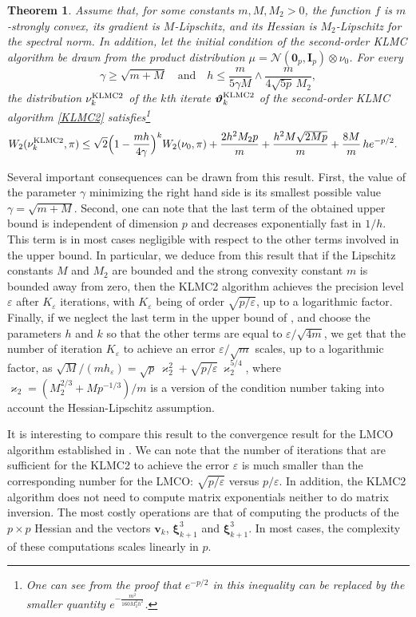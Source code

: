 \documentclass[a4paper,bej,preprint,reqno]{imsart}
\newcommand\bv{\boldsymbol v}
\newcommand\bxi{\boldsymbol \xi}
\newcommand\bfI{\mathbf I}
\newcommand\bvartheta{\boldsymbol\vartheta}
\newtheorem{theorem}{Theorem}
\begin{document}
\begin{theorem}\label{th:4}
Assume that, for some constants $m,M,M_2>0$, the function $f$ is
$m$-strongly convex, its gradient is $M$-Lipschitz, and its Hessian is $M_2$-Lipschitz for the spectral norm.
In addition, let the initial condition of the second-order KLMC algorithm be drawn
from the product distribution $\mu = \mathcal N(\mathbf 0_p,\bfI_p)\otimes \nu_0$.
For every 
$$
\gamma\ge \sqrt{m+M}\quad \text{and}\quad h\le \frac{m}{5\gamma M}\wedge
\frac{m}{4\sqrt{5p}\,M_2}, 
$$
the distribution
$\nu_k^{\rm KLMC2}$  of the $k$th iterate $\bvartheta_k^{\rm KLMC2}$ of the
second-order KLMC algorithm \eqref{KLMC2} satisfies\footnote{One can see
from the proof that $e^{-p/2}$ in this inequality can be replaced
by the smaller quantity $e^{-\frac{m^2}{160 M_2^2h^2}}$.
}
\begin{align}
		W_2(\nu_k^{\rm KLMC2},\pi)
		&\le \sqrt{2}\Big(1-\frac{mh}{4\gamma}\Big)^{k}W_2(\nu_0,\pi)		
		+\frac{2h^2{M_2p}}{m}+\frac{h^2 M\sqrt{2Mp}}{{m}}
		+ \frac{8M}{m}\, h e^{-p/2} .\label{s5:1}
\end{align}
\end{theorem}

Several important consequences can be drawn from this result. First, 
the value of the parameter $\gamma$ minimizing the right hand side is its smallest
possible value $\gamma = \sqrt{m+M}$. Second, one can note that the last term of 
the obtained upper bound is independent of dimension $p$ and decreases exponentially
fast in $1/h$. This term is in most cases negligible with respect to the other terms
involved in the upper bound. In particular, we deduce from this result that if 
the Lipschitz constants $M$ and $M_2$ are bounded and the strong convexity constant 
$m$ is bounded  away from zero, then the KLMC2 algorithm achieves the precision level 
$\varepsilon$ after $K_\varepsilon$ iterations, with $K_\varepsilon$ being of order 
$\sqrt{p/\varepsilon}$, up to a logarithmic factor. Finally, if we neglect the last 
term in the upper bound of , and choose the parameters $h$ and $k$ 
so that the other terms are equal to $\varepsilon/\sqrt{4m}$, we get that
the number of iteration $K_{\varepsilon}$ to achieve an error $\varepsilon/\sqrt{m}$ 
scales, up to a logarithmic factor, as  $\sqrt{M}/(mh_\varepsilon) = 
\sqrt{p}\,\varkappa_2^2 + \sqrt{p/\varepsilon}\,\varkappa_2^{5/4}$, where 
$\varkappa_2 = (M_2^{2/3} + Mp^{-1/3})/m$ is a version of the condition number 
taking into account the Hessian-Lipschitz assumption.

It is interesting to compare this result to the convergence result for the LMCO
algorithm established in \citep{DalKar17}. We can note that the number of iterations
that are sufficient for the KLMC2 to achieve the error $\varepsilon$ is much smaller
than the corresponding number for the LMCO: $\sqrt{p/\varepsilon}$ versus
$p/\varepsilon$. In addition, the KLMC2 algorithm does not need to compute matrix
exponentials neither to do matrix inversion. The most costly operations are that
of computing the products of the $p\times p$ Hessian and the vectors $\bv_k$, 
$\bxi_{k+1}^{3}$ and $\bxi_{k+1}^{3}$. In most cases, the complexity of these 
computations scales linearly in $p$. 
\end{document}
